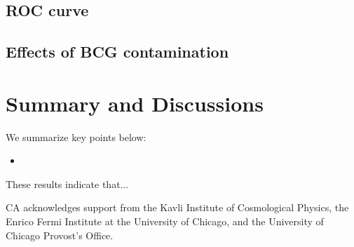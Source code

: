 \documentclass{emulateapj}
\begin{document}
\subsection{ROC curve}

\subsection{Effects of BCG contamination}

\section{Summary and Discussions}
\label{sec:conclusions}

We summarize key points below:

\begin{itemize}

\item 
    
\end{itemize}

These results indicate that...

\acknowledgments CA acknowledges support from the Kavli Institute of
Cosmological Physics, the Enrico Fermi Institute at the University of
Chicago, and the University of Chicago Provost's Office.
\lastpagefootnotes



\end{document}
